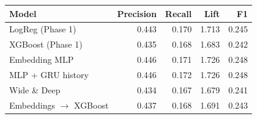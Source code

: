 \begin{tabular}{lrrrr}
\toprule
Model & Precision & Recall & Lift & F1 \\
\midrule
LogReg (Phase 1) & 0.443 & 0.170 & 1.713 & 0.245 \\
XGBoost (Phase 1) & 0.435 & 0.168 & 1.683 & 0.242 \\
Embedding MLP & 0.446 & 0.171 & 1.726 & 0.248 \\
MLP + GRU history & 0.446 & 0.172 & 1.726 & 0.248 \\
Wide \& Deep & 0.434 & 0.167 & 1.679 & 0.241 \\
Embeddings $\rightarrow$ XGBoost & 0.437 & 0.168 & 1.691 & 0.243 \\
\bottomrule
\end{tabular}
